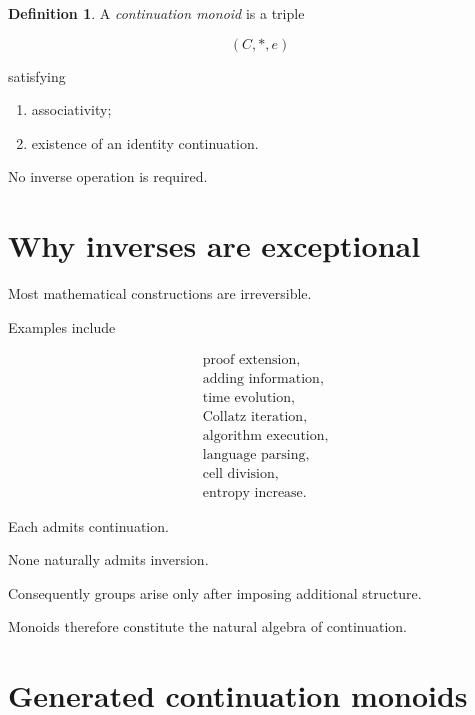 \documentclass[13pt,openany]{book}
\theoremstyle{plain}
\theoremstyle{definition}
\newtheorem{definition}{Definition}[chapter]
\begin{document}
\begin{definition}

A \emph{continuation monoid} is a triple

\[
(C,*,e)
\]

satisfying

\begin{enumerate}
\item associativity;

\item existence of an identity continuation.
\end{enumerate}

\end{definition}

No inverse operation is required.

\section{Why inverses are exceptional}

Most mathematical constructions are irreversible.

Examples include

\[
\begin{aligned}
&\text{proof extension},\\
&\text{adding information},\\
&\text{time evolution},\\
&\text{Collatz iteration},\\
&\text{algorithm execution},\\
&\text{language parsing},\\
&\text{cell division},\\
&\text{entropy increase}.
\end{aligned}
\]

Each admits continuation.

None naturally admits inversion.

Consequently groups arise only after imposing additional structure.

Monoids therefore constitute the natural algebra of continuation.

\section{Generated continuation monoids}
\end{document}
